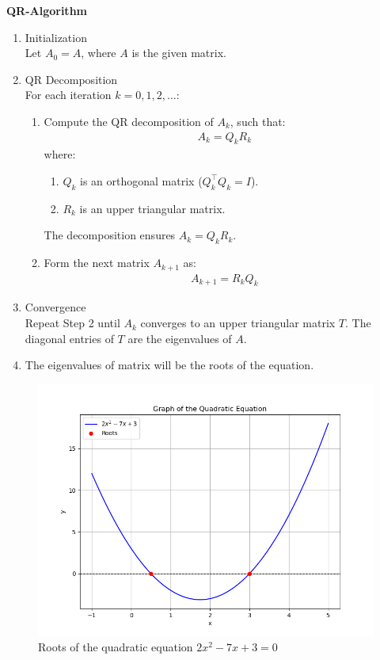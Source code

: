 \documentclass[journal]{IEEEtran}
\begin{document}
\textbf{QR-Algorithm}\\
\begin{enumerate}
\item Initialization \\
Let $A_0 = A $, where $A$ is the given matrix.

\item QR Decomposition \\
For each iteration $ k = 0, 1, 2, \dots $:
\begin{enumerate}
    \item Compute the QR decomposition of \( A_k \), such that:
    \begin{align}
    A_k = Q_k R_k
    \end{align}
    where:
    \begin{enumerate}
        \item $Q_k $ is an orthogonal matrix ($ Q_k^\top Q_k = I $).
        \item $ R_k $ is an upper triangular matrix.
    \end{enumerate}
    The decomposition ensures $ A_k = Q_k R_k $.

    \item Form the next matrix \( A_{k+1} \) as:
    \begin{align}
    A_{k+1} = R_k Q_k
    \end{align}
\end{enumerate}

\item Convergence\\
Repeat Step 2 until $ A_k $ converges to an upper triangular matrix $ T $. The diagonal entries of $T$ are the eigenvalues of $A$.\\
\item The eigenvalues of matrix will be the roots of the equation.


\end{enumerate}
\begin{figure}[h!]
   \centering
   \includegraphics[width=0.7\linewidth]{figs/fig1.png}
   \caption{Roots of the quadratic equation $2x^2 - 7x + 3 = 0$}
\end{figure}
\end{document}
